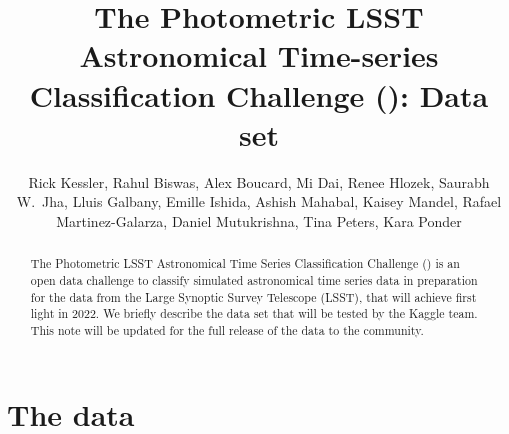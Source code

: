 \documentclass[\docopts]{\docclass}
\author{Rick Kessler,  Rahul Biswas, Alex Boucard, Mi Dai, Renee Hlozek,
Saurabh W.~Jha, Lluis Galbany, Emille Ishida, Ashish Mahabal, Kaisey Mandel, Rafael Martinez-Galarza, Daniel Mutukrishna, Tina Peters, Kara Ponder}
\begin{document}
\title{The Photometric LSST Astronomical Time-series Classification Challenge ({\plasticc}): Data set}


\begin{abstract}
The Photometric LSST Astronomical Time Series Classification Challenge ({\plasticc}) is an open data challenge to classify simulated astronomical time series data in preparation for the data from the Large Synoptic Survey Telescope (LSST), that will achieve first light in 2022. We briefly describe the {\plasticc} data set that will be tested by the Kaggle team. This note will be updated for the full release of the data to the community.

\end{abstract}

\dockeys{}

\maketitlepost


\section{The data}
\label{sec:thedata}
\end{document}
